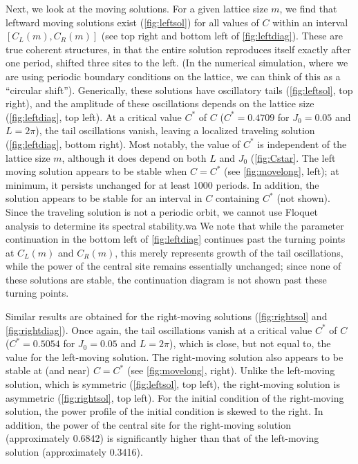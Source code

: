 \documentclass[reprint, amsmath,amssymb,aps,pre]{revtex4-2}
\begin{document}
Next, we look at the moving solutions. For a given lattice size $m$, we find that leftward moving solutions exist (\cref{fig:leftsol}) for all values of $C$ within an interval $[C_L(m), C_R(m)]$ (see top right and bottom left of \cref{fig:leftdiag}).
These are true coherent structures, in that the entire solution reproduces itself exactly after one period, shifted three sites to the left. (In the numerical simulation, where we are using periodic boundary conditions on the lattice, we can think of this as a ``circular shift''). Generically, these solutions have oscillatory tails (\cref{fig:leftsol}, top right), and the amplitude of these oscillations depends on the lattice size (\cref{fig:leftdiag}, top left). At a critical value $C^*$ of $C$ ($C^* = 0.4709$ for $J_0 = 0.05$ and $L=2\pi$), the tail oscillations vanish, leaving a localized traveling solution (\cref{fig:leftdiag}, bottom right). Most notably, the value of $C^*$ is independent of the lattice size $m$, although it does depend on both $L$ and $J_0$ (\cref{fig:Cstar}. The left moving solution appears to be stable when $C=C^*$ (see \cref{fig:movelong}, left); at minimum, it persists unchanged for at least 1000 periods. In addition, the solution appears to be stable for an interval in $C$ containing $C^*$ (not shown). Since the traveling solution is not a periodic orbit, we cannot use Floquet analysis to determine its spectral stability.wa
We note that while the parameter continuation in the bottom left of \cref{fig:leftdiag} continues past the turning points at $C_L(m)$ and $C_R(m)$, this merely represents growth of the tail oscillations, while the power of the central site remains essentially unchanged; since none of these solutions are stable, the continuation diagram is not shown past these turning points. 

Similar results are obtained for the right-moving solutions (\cref{fig:rightsol} and \cref{fig:rightdiag}). Once again, the tail oscillations vanish at a critical value $C^*$ of $C$ ($C^* = 0.5054$ for $J_0 = 0.05$ and $L=2\pi$), which is close, but not equal to, the value for the left-moving solution. The right-moving solution also appears to be stable at (and near) $C=C^*$ (see \cref{fig:movelong}, right). Unlike the left-moving solution, which is symmetric (\cref{fig:leftsol}, top left), the right-moving solution is asymmetric (\cref{fig:rightsol}, top left). For the initial condition of the right-moving solution, the power profile of the initial condition is skewed to the right. In addition, the power of the central site for the right-moving solution (approximately 0.6842) is significantly higher than that of the left-moving solution (approximately 0.3416).
\end{document}
